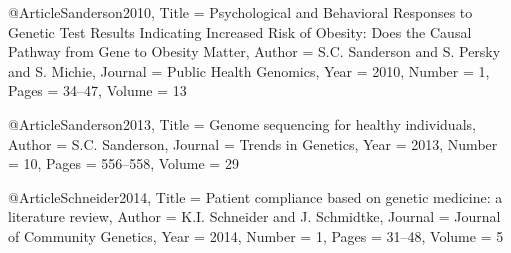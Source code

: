 @Article{Sanderson2010,
  Title                    = {Psychological and Behavioral Responses to Genetic Test Results Indicating Increased Risk of Obesity: Does the Causal Pathway from Gene to Obesity Matter},
  Author                   = {S.C. Sanderson and S. Persky and S. Michie},
  Journal                  = {Public Health Genomics},
  Year                     = {2010},
  Number                   = {1},
  Pages                    = {34--47},
  Volume                   = {13}
}

@Article{Sanderson2013,
  Title                    = {Genome sequencing for healthy individuals},
  Author                   = {S.C. Sanderson},
  Journal                  = {Trends in Genetics},
  Year                     = {2013},
  Number                   = {10},
  Pages                    = {556--558},
  Volume                   = {29}
}

@Article{Schneider2014,
  Title                    = {Patient compliance based on genetic medicine: a literature review},
  Author                   = {K.I. Schneider and J. Schmidtke},
  Journal                  = {Journal of Community Genetics},
  Year                     = {2014},
  Number                   = {1},
  Pages                    = {31--48},
  Volume                   = {5}
}

